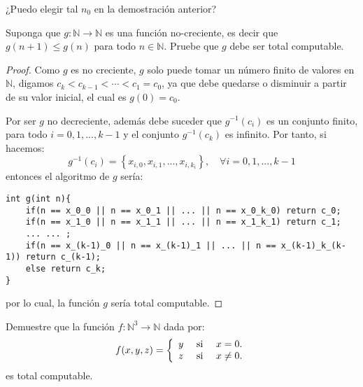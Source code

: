 \documentclass[12pt]{report}
\newcounter{it}
\theoremstyle{largebreak}
\newcommand\cf[3]{\ensuremath{#1:#2\rightarrow#3}}
\begin{document}
    \begin{obs}
        ¿Puedo elegir tal $n_0$ en la demostración anterior?
    \end{obs}

    \begin{excer}
        Suponga que $\cf{g}{\mathbb{N}}{\mathbb{N}}$ es una función no-creciente, es decir que $g(n+1)\leq g(n)$ para todo $n\in\mathbb{N}$. Pruebe que $g$ debe ser total computable.
    \end{excer}

    \begin{proof}
        Como $g$ es no creciente, $g$ solo puede tomar un número finito de valores en $\mathbb{N}$, digamos $c_k<c_{ k-1}<\cdots<c_1=c_0$, ya que debe quedarse o disminuir a partir de su valor inicial, el cual es $g(0)=c_0$.

        Por ser $g$ no decreciente, además debe suceder que $g^{-1}(c_i)$ es un conjunto finito, para todo $i=0,1,...,k-1$ y el conjunto $g^{-1}(c_k)$ es infinito. Por tanto, si hacemos:
        \begin{equation*}
            g^{-1}(c_i)=\left\{x_{i,0},x_{i,1},...,x_{ i,k_i}\right\},\quad\forall i=0,1,...,k-1
        \end{equation*}
        entonces el algoritmo de $g$ sería:
        \begin{lstlisting}
int g(int n){
    if(n == x_0_0 || n == x_0_1 || ... || n == x_0_k_0) return c_0;
    if(n == x_1_0 || n == x_1_1 || ... || n == x_1_k_1) return c_1;
    ... ... ;
    if(n == x_(k-1)_0 || n == x_(k-1)_1 || ... || n == x_(k-1)_k_(k-1)) return c_(k-1);
    else return c_k;
}
        \end{lstlisting}
        por lo cual, la función $g$ sería total computable.        
    \end{proof}

    \begin{excer}
        Demuestre que la función $\cf{f}{\mathbb{N}^3}{\mathbb{N}}$ dada por:
        \begin{equation*}
            f(x,y,z)=\left\{
                \begin{array}{lcr}
                    y & \textup{ si } & x=0.\\
                    z & \textup{ si } & x\neq0.\\
                \end{array}
            \right.
        \end{equation*}
        es total computable.
    \end{excer}
\end{document}
